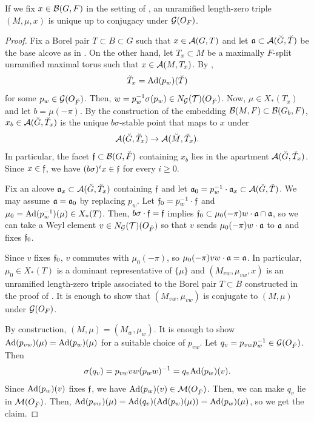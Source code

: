 \documentclass[12pt,reqno]{amsart}
\begin{document}
\begin{prop} \label{prop:uniqueness_triple}
    If we fix $x \in {\mathcal{B}}(G, F)$ in the setting of , an unramified length-zero triple $(M, \mu, x)$ is unique up to conjugacy under ${\mathcal{G}}(O_F)$. 
\end{prop}
\begin{proof}
    Fix a Borel pair $T \subset B \subset G$ such that $x \in {\mathcal{A}}(G, T)$ and let ${\mathfrak{a}} \subset {\mathcal{A}}(\breve{G}, \breve{T})$ be the base alcove as in . On the other hand, let $T_x \subset M$ be a maximally $F$-split unramified maximal torus such that $x \in {\mathcal{A}}(M, T_x)$. By \cite[4.1.12 (3)]{KP23}, 
    \[
        \breve{T}_x = {\operatorname{Ad}}(p_w)(\breve{T})
    \]
    for some $p_w \in {\mathcal{G}}(O_{\breve{F}})$. Then, $w = p_w^{-1} \sigma(p_w) \in N_{{\mathcal{G}}}({\mathcal{T}})(O_{\breve{F}})$. Now, $\mu \in X_*(T_x)$ and let $b = \mu(-\pi)$. By the construction of the embedding ${\mathcal{B}}(M, F) \subset {\mathcal{B}}(G_b, F)$, $x_b \in {\mathcal{A}}(\breve{G}, \breve{T}_x)$ is the unique $b\sigma$-stable point that maps to $x$ under 
    \[
        {\mathcal{A}}(\breve{G}, \breve{T}_x) \to {\mathcal{A}}(\breve{M}, \breve{T}_x). 
    \]
    In particular, the facet ${\mathfrak{f}} \subset {\mathcal{B}}(G, \breve{F})$ containing $x_b$ lies in the apartment ${\mathcal{A}}(\breve{G}, \breve{T}_x)$. Since $x \in {\mathfrak{f}}$, we have $(b\sigma)^i x \in {\mathfrak{f}}$ for every $i \geq 0$. 
    
    Fix an alcove ${\mathfrak{a}}_x \subset {\mathcal{A}}(\breve{G}, \breve{T}_x)$ containing ${\mathfrak{f}}$ and let ${\mathfrak{a}}_0 = p_w^{-1} \cdot {\mathfrak{a}}_x \subset {\mathcal{A}}(\breve{G}, \breve{T})$. We may assume ${\mathfrak{a}} = {\mathfrak{a}}_0$ by replacing $p_w$. Let ${\mathfrak{f}}_0 = p_w^{-1} \cdot {\mathfrak{f}}$ and  $\mu_0 = {\operatorname{Ad}}(p_w^{-1})(\mu) \in X_*(T)$. Then, $b\sigma \cdot {\mathfrak{f}} = {\mathfrak{f}}$ implies $ {\mathfrak{f}}_0 \subset \mu_0(-\pi)w \cdot {\mathfrak{a}} \cap {\mathfrak{a}}$, so we can take a Weyl element $v \in N_{{\mathcal{G}}}({\mathcal{T}})(O_{\breve{F}})$ so that $v$ sends $\mu_0(-\pi)w \cdot {\mathfrak{a}}$ to ${\mathfrak{a}}$ and fixes ${\mathfrak{f}}_0$. 

    Since $v$ fixes ${\mathfrak{f}}_0$, $v$ commutes with $\mu_0(-\pi)$, so $\mu_0(-\pi)vw \cdot {\mathfrak{a}} = {\mathfrak{a}}$. In particular, $\mu_0 \in X_*(T)$ is a dominant representative of $\{ \mu \}$ and $(M_{vw}, \mu_{vw}, x)$ is an unramified length-zero triple associated to the Borel pair $T \subset B$ constructed in the proof of . It is enough to show that $(M_{vw}, \mu_{vw})$ is conjugate to $(M, \mu)$ under ${\mathcal{G}}(O_F)$. 

    By construction, $(M, \mu) = (M_w, \mu_w)$. It is enough to show ${\operatorname{Ad}}(p_{vw})(\mu) = {\operatorname{Ad}}(p_w)(\mu)$ for a suitable choice of $p_{vw}$. Let $q_v = p_{vw} p_w^{-1} \in {\mathcal{G}}(O_{\breve{F}})$. Then
    \[
        \sigma(q_v) = p_{vw} vw (p_w w)^{-1} = q_v {\operatorname{Ad}}(p_w)(v). 
    \]
    Since ${\operatorname{Ad}}(p_w)(v)$ fixes ${\mathfrak{f}}$, we have ${\operatorname{Ad}}(p_w)(v) \in {\mathcal{M}}(O_{\breve{F}})$. Then, we can make $q_v$ lie in ${\mathcal{M}}(O_{\breve{F}})$. Then, ${\operatorname{Ad}}(p_{vw})(\mu) = {\operatorname{Ad}}(q_v)({\operatorname{Ad}}(p_w)(\mu)) = {\operatorname{Ad}}(p_w)(\mu)$, so we get the claim. 
\end{proof}
\end{document}
